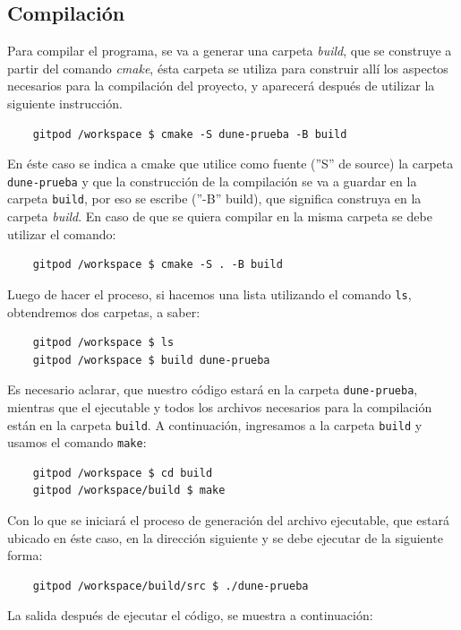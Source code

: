 \subsection{Compilación}
Para compilar el programa, se va a generar una carpeta \textit{build},
que se construye a partir del comando \textit{cmake}, ésta carpeta
se utiliza para construir allí los aspectos necesarios para la compilación del proyecto, y aparecerá después
de utilizar la siguiente instrucción.
\begin{verbatim}
	gitpod /workspace $ cmake -S dune-prueba -B build
\end{verbatim}
En éste caso se indica a cmake que utilice como fuente (''S'' de source) la carpeta \verb|dune-prueba| y
que la construcción de la compilación se va a guardar en la carpeta \verb|build|, por eso se escribe (''-B'' build),
que significa construya en la carpeta \textit{build}.
En caso de que se quiera compilar en la misma carpeta se debe utilizar el comando:
\begin{verbatim}
	gitpod /workspace $ cmake -S . -B build
\end{verbatim}
Luego de hacer el proceso, si hacemos una lista utilizando el comando \verb|ls|, obtendremos dos carpetas, a saber:
\begin{verbatim}
	gitpod /workspace $ ls
	gitpod /workspace $ build dune-prueba
\end{verbatim}
Es necesario aclarar, que nuestro código estará en la carpeta \verb|dune-prueba|, mientras que el ejecutable y
todos los archivos necesarios para la compilación están en la carpeta \verb|build|.  A continuación, ingresamos
a la carpeta \verb|build| y usamos el comando \verb|make|:
\begin{verbatim}
	gitpod /workspace $ cd build
	gitpod /workspace/build $ make
\end{verbatim}
Con lo que se iniciará el proceso de generación del archivo ejecutable, que estará ubicado en éste caso, en
la dirección siguiente y se debe ejecutar de la siguiente forma:
\begin{verbatim}
	gitpod /workspace/build/src $ ./dune-prueba
\end{verbatim}
La salida después de ejecutar el código, se muestra a continuación:
\begin{listing}[ht!]
	\inputminted{bash}{dune-learn-1.txt}
\end{listing}

\immediate{}
